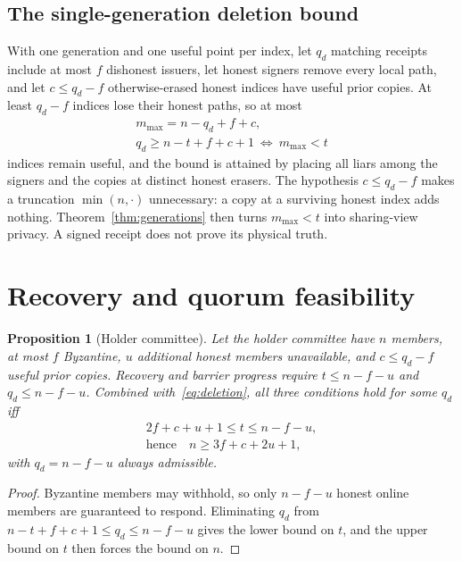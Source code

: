 \documentclass[pdflatex,sn-mathphys-num]{sn-jnl}%
\theoremstyle{plain}
\newtheorem{proposition}[theorem]{Proposition}
\theoremstyle{definition}
\begin{document}
\subsection{The single-generation deletion bound}
With one generation and one useful point per index, let $q_d$ matching receipts include at most $f$ dishonest issuers, let honest signers remove every local path, and let $c\le q_d-f$ otherwise-erased honest indices have useful prior copies. At least $q_d-f$ indices lose their honest paths, so at most
\begin{equation}\label{eq:deletion}
\begin{gathered}
 m_{\max}=n-q_d+f+c,\\
 q_d\ge n-t+f+c+1\ \Longleftrightarrow\ m_{\max}<t
\end{gathered}
\end{equation}
indices remain useful, and the bound is attained by placing all liars among the signers and the copies at distinct honest erasers. The hypothesis $c\le q_d-f$ makes a truncation $\min(n,\cdot)$ unnecessary: a copy at a surviving honest index adds nothing. Theorem~\ref{thm:generations} then turns $m_{\max}<t$ into sharing-view privacy. A signed receipt does not prove its physical truth.


\section{Recovery and quorum feasibility}\label{sec:quorum}

\begin{proposition}[Holder committee]\label{prop:holders}
Let the holder committee have $n$ members, at most $f$ Byzantine, $u$ additional honest members unavailable, and $c\le q_d-f$ useful prior copies. Recovery and barrier progress require $t\le n-f-u$ and $q_d\le n-f-u$. Combined with~\eqref{eq:deletion}, all three conditions hold for some $q_d$ iff
\begin{equation}\label{eq:feasible}
\begin{gathered}
 2f+c+u+1\le t\le n-f-u,\\
 \text{hence}\quad n\ge3f+c+2u+1,
\end{gathered}
\end{equation}
with $q_d=n-f-u$ always admissible.
\end{proposition}
\begin{proof}
Byzantine members may withhold, so only $n-f-u$ honest online members are guaranteed to respond. Eliminating $q_d$ from $n-t+f+c+1\le q_d\le n-f-u$ gives the lower bound on $t$, and the upper bound on $t$ then forces the bound on $n$.
\end{proof}
\end{document}

